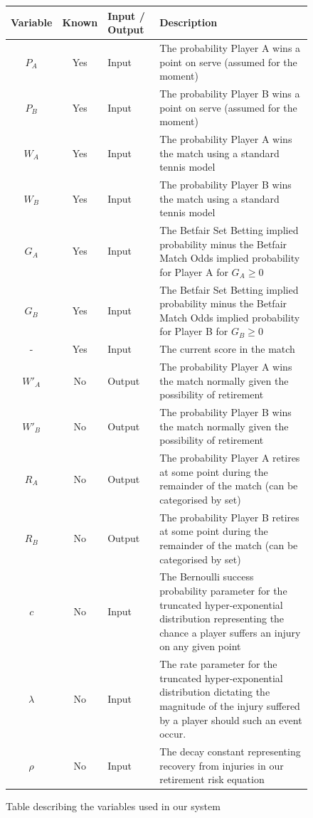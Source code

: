 \documentclass[letterpaper,12pt]{article}
\begin{document}
\begin{figure}[H]
\begin{center}
\renewcommand{\arraystretch}{1.1}
\begin{tabular}{|c|c|C{1.5cm}|C{7.3cm}|}
	\hline
	\textbf{Variable} & \textbf{Known} & \textbf{Input / Output} & \textbf{Description} \\ \hline
	$P_A$ & Yes & Input & The probability Player A wins a point on serve (assumed for the moment) \\ \hline
	$P_B$ & Yes & Input & The probability Player B wins a point on serve (assumed for the moment) \\ \hline
	$W_A$ & Yes & Input & The probability Player A wins the match using a standard tennis model \\ \hline
	$W_B$ & Yes & Input & The probability Player B wins the match using a standard tennis model	 \\ \hline
	$G_A$ & Yes & Input & The Betfair Set Betting implied probability minus the Betfair Match Odds implied probability for Player A for $G_A \geq 0$ \\ \hline
	$G_B$ & Yes & Input & The Betfair Set Betting implied probability minus the Betfair Match Odds implied probability for Player B for $G_B \geq 0$	 \\ \hline
	- & Yes & Input & The current score in the match \\ \hline \hline
	$W'_A$ & No & Output & The probability Player A wins the match normally given the possibility of retirement \\ \hline
	$W'_B$ & No & Output & The probability Player B wins the match normally given the possibility of retirement \\ \hline
	$R_A$ & No & Output & The probability Player A retires at some point during the remainder of the match (can be categorised by set) \\ \hline
	$R_B$ & No & Output & The probability Player B retires at some point during the remainder of the match (can be categorised by set) \\ \hline \hline
	$c$ & No & Input & The Bernoulli success probability parameter for the truncated hyper-exponential distribution representing the chance a player suffers an injury on any given point	\\ \hline
	$\lambda$ & No & Input & The rate parameter for the truncated hyper-exponential distribution dictating the magnitude of the injury suffered by a player should such an event occur. \\ \hline
	$\rho$ & No & Input & The decay constant representing recovery from injuries in our retirement risk equation	 \\ \hline
\end{tabular}
\renewcommand{\arraystretch}{1}
\end{center}
\caption{Table describing the variables used in our system}
\label{variabletable}
\end{figure}
\end{document}
